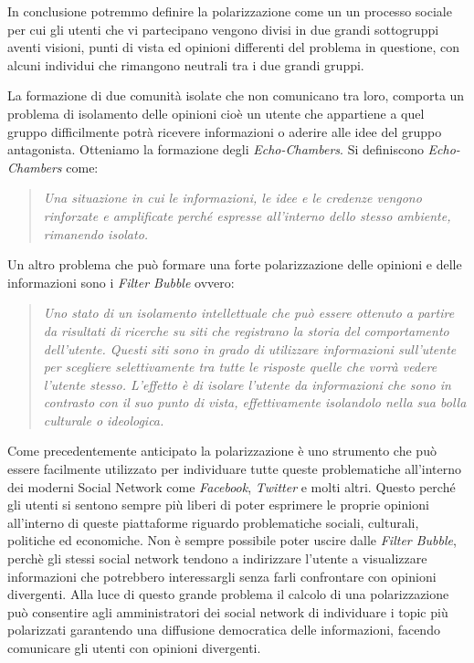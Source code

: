 In conclusione potremmo definire la polarizzazione come un un processo sociale per cui gli utenti che vi partecipano vengono divisi in due grandi sottogruppi aventi visioni, punti di vista ed opinioni differenti del problema in questione, con alcuni individui che rimangono neutrali tra i due grandi gruppi.

La formazione di due comunità isolate che non comunicano tra loro, comporta un problema di isolamento delle opinioni
cioè un utente che appartiene a quel gruppo difficilmente potrà ricevere informazioni o aderire alle idee del gruppo antagonista.
Otteniamo  la formazione degli \textit{Echo-Chambers}. Si definiscono \textit{Echo-Chambers} come:
\begin{quote} 
\textit{Una situazione in cui le informazioni, le idee e le credenze vengono rinforzate e amplificate perché espresse all'interno dello stesso ambiente, rimanendo isolato.}
\end{quote}

Un altro problema che può formare una forte polarizzazione delle opinioni e delle informazioni sono i \textit{Filter Bubble} ovvero:

\begin{quote} 
\textit{Uno stato di un isolamento intellettuale che può essere ottenuto a partire da risultati di ricerche su siti che registrano la storia del comportamento dell'utente. Questi siti sono in grado di utilizzare informazioni sull'utente per scegliere selettivamente tra tutte le risposte quelle che vorrà vedere l'utente stesso. L'effetto è di isolare l'utente da informazioni che sono in contrasto con il suo punto di vista, effettivamente isolandolo nella sua bolla culturale o ideologica.}
\end{quote}

Come precedentemente anticipato la polarizzazione è uno strumento che può essere facilmente utilizzato per individuare tutte queste problematiche all'interno dei moderni Social Network come \textit{Facebook}, \textit{Twitter } e molti altri. Questo perché gli utenti si sentono sempre più liberi di poter esprimere le proprie opinioni all'interno di queste piattaforme riguardo problematiche sociali, culturali, politiche ed economiche.
Non è sempre possibile poter uscire dalle \textit{Filter Bubble}, perchè gli stessi social network tendono a indirizzare l'utente a visualizzare informazioni che potrebbero interessargli senza farli confrontare con opinioni divergenti. 
Alla luce di questo grande problema il calcolo di una polarizzazione può consentire agli amministratori dei social network di individuare i topic più polarizzati garantendo una diffusione democratica delle informazioni, facendo comunicare gli utenti con opinioni divergenti.

